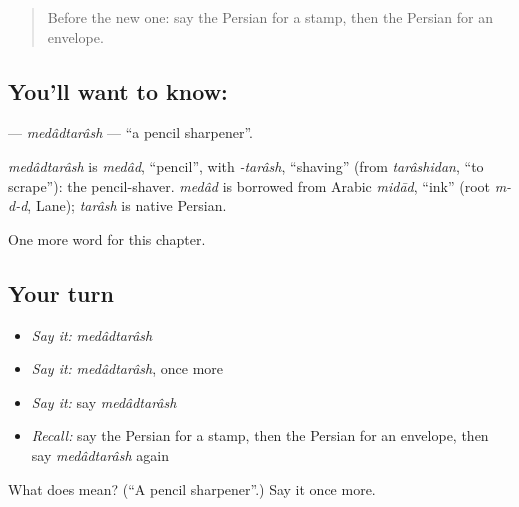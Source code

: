 \label{lesson:FA-C113-medadtarash}



\begin{quote}
Before the new one: say the Persian for a stamp, then the Persian for an envelope.
\end{quote}

\subsection*{You'll want to know: }
\textbf{} — \emph{medâdtarâsh} — \textquotedblleft{}a pencil sharpener\textquotedblright{}.

\begin{cousinweb}
\emph{medâdtarâsh} is \emph{medâd}, \textquotedblleft{}pencil\textquotedblright{}, with \emph{-tarâsh}, \textquotedblleft{}shaving\textquotedblright{} (from \emph{tarâshidan}, \textquotedblleft{}to scrape\textquotedblright{}): the pencil-shaver. \emph{medâd} is borrowed from Arabic \emph{midād}, \textquotedblleft{}ink\textquotedblright{} (root \emph{m-d-d}, Lane); \emph{tarâsh} is native Persian.
\end{cousinweb}

\begin{grammarlens}[title={What you've built}]
One more word for this chapter.
\end{grammarlens}

\subsection*{Your turn}
\begin{itemize}
\raggedright
  \item \emph{Say it:} \emph{medâdtarâsh}
  \item \emph{Say it:} \emph{medâdtarâsh}, once more
  \item \emph{Say it:} say \emph{medâdtarâsh}
  \item \emph{Recall:} say the Persian for a stamp, then the Persian for an envelope, then say \emph{medâdtarâsh} again
\end{itemize}

\begin{tcolorbox}[breakable,colback=teal!4,colframe=teal!35!black,title={Before you move on}]
What does  mean? (\textquotedblleft{}A pencil sharpener\textquotedblright{}.) Say it once more.
\end{tcolorbox}
